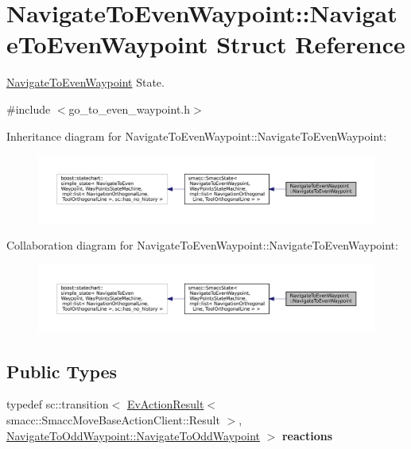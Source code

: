 \hypertarget{structNavigateToEvenWaypoint_1_1NavigateToEvenWaypoint}{}\section{Navigate\+To\+Even\+Waypoint\+:\+:Navigate\+To\+Even\+Waypoint Struct Reference}
\label{structNavigateToEvenWaypoint_1_1NavigateToEvenWaypoint}


\hyperlink{structNavigateToEvenWaypoint_1_1NavigateToEvenWaypoint}{Navigate\+To\+Even\+Waypoint} State.  




{\ttfamily \#include $<$go\+\_\+to\+\_\+even\+\_\+waypoint.\+h$>$}



Inheritance diagram for Navigate\+To\+Even\+Waypoint\+:\+:Navigate\+To\+Even\+Waypoint\+:
\nopagebreak
\begin{figure}[H]
\begin{center}
\leavevmode
\includegraphics[width=350pt]{structNavigateToEvenWaypoint_1_1NavigateToEvenWaypoint__inherit__graph}
\end{center}
\end{figure}


Collaboration diagram for Navigate\+To\+Even\+Waypoint\+:\+:Navigate\+To\+Even\+Waypoint\+:
\nopagebreak
\begin{figure}[H]
\begin{center}
\leavevmode
\includegraphics[width=350pt]{structNavigateToEvenWaypoint_1_1NavigateToEvenWaypoint__coll__graph}
\end{center}
\end{figure}
\subsection*{Public Types}
\begin{DoxyCompactItemize}
\item 
\mbox{\label{structNavigateToEvenWaypoint_1_1NavigateToEvenWaypoint_a679bd0d719bf338ba0adbb7516aa7031}} 
typedef sc\+::transition$<$ \hyperlink{structsmacc_1_1EvActionResult}{Ev\+Action\+Result}$<$ smacc\+::\+Smacc\+Move\+Base\+Action\+Client\+::\+Result $>$, \hyperlink{structNavigateToOddWaypoint_1_1NavigateToOddWaypoint}{Navigate\+To\+Odd\+Waypoint\+::\+Navigate\+To\+Odd\+Waypoint} $>$ {\bfseries reactions}
\end{DoxyCompactItemize}
